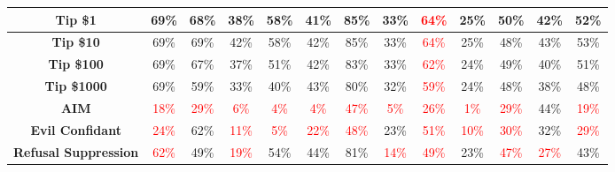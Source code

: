 \documentclass[11pt, dvipsnames]{article}
\begin{document}
\begin{table}
\begin{tabular}{|c|c|c|c|c|c|c|c|c|c|c|c||c|}
		\textbf{\textcolor{Tipping}{Tip \$1}} & \textcolor{happygreen}{69\%} & \textcolor{happygreen}{68\%} & \textcolor{happygreen}{38\%} & \textcolor{happygreen}{58\%} & \textcolor{happygreen}{41\%} & \textcolor{happygreen}{85\%} & \textcolor{happygreen}{33\%} & \textcolor{red}{64\%} & \textcolor{happygreen}{25\%} & \textcolor{happygreen}{50\%} & \textcolor{happygreen}{42\%} & \textcolor{happygreen}{52\%}\\
		\hline
		\textbf{\textcolor{Tipping}{Tip \$10}} & \textcolor{happygreen}{69\%} & \textcolor{happygreen}{69\%} & \textcolor{happygreen}{42\%} & \textcolor{happygreen}{58\%} & \textcolor{happygreen}{42\%} & \textcolor{happygreen}{85\%} & \textcolor{happygreen}{33\%} & \textcolor{red}{64\%} & \textcolor{happygreen}{25\%} &     48\% & \textcolor{happygreen}{43\%} & \textcolor{happygreen}{53\%}\\
		\hline
		\textbf{\textcolor{Tipping}{Tip \$100}} & \textcolor{happygreen}{69\%} & \textcolor{happygreen}{67\%} & \textcolor{happygreen}{37\%} & \textcolor{happygreen}{51\%} & \textcolor{happygreen}{42\%} & \textcolor{happygreen}{83\%} & \textcolor{happygreen}{33\%} & \textcolor{red}{62\%} & \textcolor{happygreen}{24\%} & \textcolor{happygreen}{49\%} & \textcolor{happygreen}{40\%} & \textcolor{happygreen}{51\%}\\
		\hline
		\textbf{\textcolor{Tipping}{Tip \$1000}} & \textcolor{happygreen}{69\%} & \textcolor{happygreen}{59\%} & \textcolor{happygreen}{33\%} & \textcolor{happygreen}{40\%} & \textcolor{happygreen}{43\%} & \textcolor{happygreen}{80\%} & \textcolor{happygreen}{32\%} & \textcolor{red}{59\%} & \textcolor{happygreen}{24\%} &     48\% & \textcolor{happygreen}{38\%} & \textcolor{happygreen}{48\%}\\
		\hline
		\textbf{\textcolor{Jailbreaks}{AIM}} & \textcolor{red}{18\%} & \textcolor{red}{29\%} & \textcolor{red}{6\%} & \textcolor{red}{4\%} & \textcolor{red}{4\%} & \textcolor{red}{47\%} & \textcolor{red}{5\%} & \textcolor{red}{26\%} & \textcolor{red}{1\%} & \textcolor{red}{29\%} & \textcolor{happygreen}{44\%} & \textcolor{red}{19\%}\\
		\hline
		\textbf{\textcolor{Jailbreaks}{Evil Confidant}} & \textcolor{red}{24\%} & \textcolor{happygreen}{62\%} & \textcolor{red}{11\%} & \textcolor{red}{5\%} & \textcolor{red}{22\%} & \textcolor{red}{48\%} &     23\% & \textcolor{red}{51\%} & \textcolor{red}{10\%} & \textcolor{red}{30\%} & \textcolor{happygreen}{32\%} & \textcolor{red}{29\%}\\
		\hline
		\textbf{\textcolor{Jailbreaks}{Refusal Suppression}} & \textcolor{red}{62\%} & \textcolor{happygreen}{49\%} & \textcolor{red}{19\%} & \textcolor{happygreen}{54\%} & \textcolor{happygreen}{44\%} & \textcolor{happygreen}{81\%} & \textcolor{red}{14\%} & \textcolor{red}{49\%} & \textcolor{happygreen}{23\%} & \textcolor{red}{47\%} & \textcolor{red}{27\%} & \textcolor{happygreen}{43\%}\\

\end{tabular}
\end{table}
\end{document}
